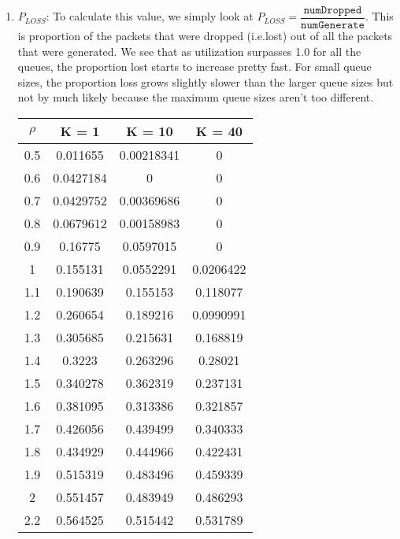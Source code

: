 \documentclass{article}
\begin{document}
\begin{enumerate}
\item $P_{LOSS}$: To calculate this value, we simply look at $P_{LOSS} =
    \dfrac{\texttt{numDropped}}{\texttt{numGenerate}}$. This is proportion of the packets
    that were dropped (i.e.lost) out of all the packets that were generated. We see that as utilization
    surpasses 1.0 for all the queues, the proportion lost starts to increase pretty fast. For small queue sizes,
    the proportion loss grows slightly slower than the larger queue sizes but not by much likely because the maximum
    queue sizes aren't too different. \newline
    \begin{center}
        \begin{tabular}{||c c c c||}
        \hline
        $\rho$ & K = 1 & K = 10 & K = 40 \\ [0.5ex]
        \hline\hline
        0.5 & 0.011655 & 0.00218341 & 0 \\
        \hline
        0.6 & 0.0427184 & 0 & 0 \\
        \hline
        0.7 & 0.0429752 & 0.00369686 & 0 \\
        \hline
        0.8 & 0.0679612 & 0.00158983 & 0 \\
        \hline
        0.9 & 0.16775 & 0.0597015 & 0 \\
        \hline
        1 & 0.155131 & 0.0552291 & 0.0206422 \\
        \hline
        1.1 & 0.190639 & 0.155153 & 0.118077 \\
        \hline
        1.2 & 0.260654 & 0.189216 & 0.0990991 \\
        \hline
        1.3 & 0.305685 & 0.215631 & 0.168819 \\
        \hline
        1.4 & 0.3223 & 0.263296 & 0.28021 \\
        \hline
        1.5 & 0.340278 & 0.362319 & 0.237131 \\
        \hline
        1.6 & 0.381095 & 0.313386 & 0.321857 \\
        \hline
        1.7 & 0.426056 & 0.439499 & 0.340333 \\
        \hline
        1.8 & 0.434929 & 0.444966 & 0.422431 \\
        \hline
        1.9 & 0.515319 & 0.483496 & 0.459339 \\
        \hline
        2 & 0.551457 & 0.483949 & 0.486293 \\
        \hline
        2.2 & 0.564525 & 0.515442 & 0.531789 \\
        \hline

\end{tabular}
\end{center}
\end{enumerate}
\end{document}
